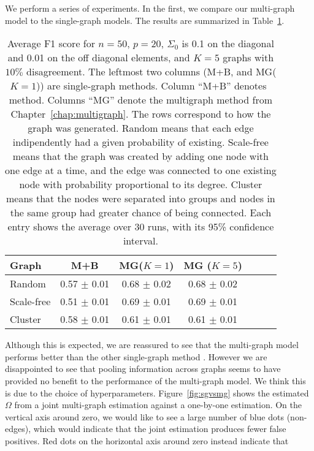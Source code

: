 \documentclass[a4paper, 11pt, oneside]{report}
\newcommand{\1}{\mathds{1}}
\begin{document}
We perform a series of experiments. In the first, we compare our multi-graph model to the single-graph models.
The results are summarized in Table~\ref{tab:mg-more-graphs}.
\begin{table}[tb]
	\caption{Average F1 score for $n=50$, $p=20$, $\Sigma_0$ is 0.1 on the diagonal and 0.01 on the off
		diagonal elements, and $K=5$ graphs with $10\%$ disagreement.
		The leftmost two columns (M+B, and MG($K = 1$)) are single-graph methods.
		Column ``M+B'' denotes~\citet{mein2006} method.
		Columns ``MG'' denote the multigraph method from Chapter~\ref{chap:multigraph}.
		The rows correspond to how the graph was generated.
		Random means that each edge indipendently had a given probability of existing.
		Scale-free means that the graph was created by adding one node with one edge at a time, and the edge was connected to one existing node with probability proportional to its degree.
		Cluster means that the nodes were separated into groups and nodes in the same group had greater chance of being connected.
		Each entry shows the average over 30 runs, with its 95\% confidence interval. }
	\label{tab:mg-more-graphs}
	\begin{center}
		\begin{tabular}[c]{l|cccccc}
			\toprule
			Graph      & M+B             & MG($K = 1$)     & MG ($K = 5$)    \\
			\midrule
			Random     & 0.57 $\pm$ 0.01 & 0.68 $\pm$ 0.02 & 0.68 $\pm$ 0.02 \\
			\midrule
			Scale-free & 0.51 $\pm$ 0.01 & 0.69 $\pm$ 0.01 & 0.69 $\pm$ 0.01 \\
			\midrule
			Cluster    & 0.58 $\pm$ 0.01 & 0.61 $\pm$ 0.01 & 0.61 $\pm$ 0.01 \\
			\bottomrule
		\end{tabular}
	\end{center}
\end{table}
Although this is expected, we are reassured to see that the multi-graph model
performs better than the other single-graph method \citep{mein2006}.
However we are disappointed to see that pooling information across graphs
seems to have provided no benefit to the performance of the multi-graph model.
We think this is due to the choice of hyperparameters.
Figure~\ref{fig:sgvsmg} shows the estimated $\Omega$ from a joint multi-graph estimation against a one-by-one estimation.
On the vertical axis around zero, we would like to see a large number of blue dots (non-edges), which would indicate
that the joint estimation produces fewer false positives. Red dots on the horizontal axis around zero instead indicate that
\end{document}
